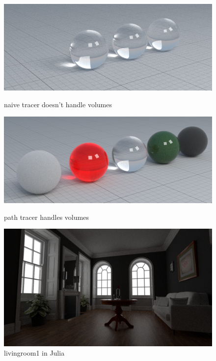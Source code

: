 \documentclass[12pt]{report}
\begin{document}
    \begin{figure}[h]
        \caption{naive tracer doesn't handle volumes}
        \includegraphics[width=\textwidth]{materials4_naive}
        \centering
        \label{fig:materials4_naive}
    \end{figure}
    
    \begin{figure}[h]
        \caption{path tracer handles volumes}
        \includegraphics[width=\textwidth]{materials4_path}
        \centering
        \label{fig:materials4_path}
    \end{figure}

    \begin{figure}[h]\label{fig:livingroom1_path}
        \caption{livingroom1 in Julia}
        \includegraphics[width=\textwidth]{livingroom1_path}
        \centering
    \end{figure}
\end{document}
